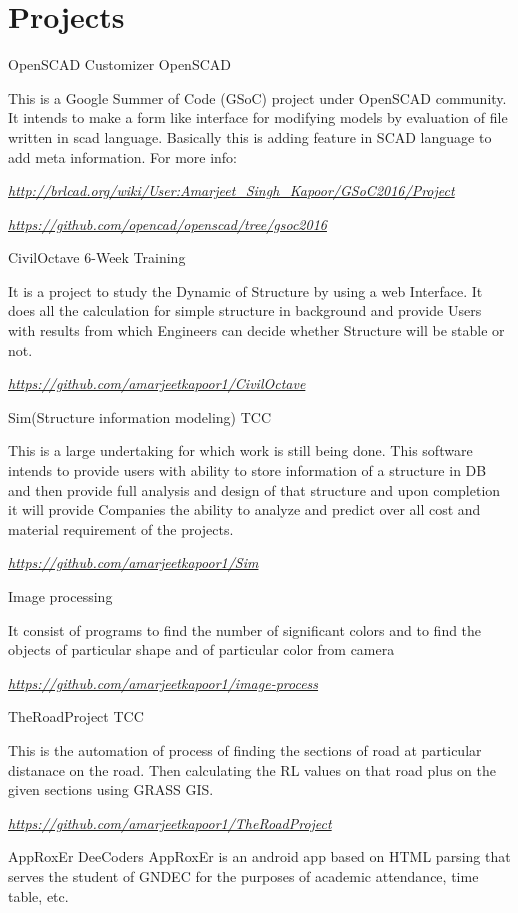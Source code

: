 \documentclass[]{friggeri-cv}
\begin{document}
\section{Projects}
\begin{entrylist}
  \entry
    {}
    {OpenSCAD Customizer}
    {OpenSCAD}
    {
        This is a Google Summer of Code (GSoC) project under OpenSCAD community. It
        intends to make a form like interface for modifying models by
        evaluation of file written in scad language. Basically this is
        adding feature in SCAD language to add meta information. For
        more info:
    
    
        \textit{\href{http://brlcad.org/wiki/User:Amarjeet_Singh_Kapoor/GSoC2016/Project}{http://brlcad.org/wiki/User:Amarjeet\_Singh\_Kapoor/GSoC2016/Project}}
        
        \textit{\href{https://github.com/openscad/openscad/tree/gsoc2016}{https://github.com/opencad/openscad/tree/gsoc2016}}
    }
  \entry
    {}
    {CivilOctave}
    {6-Week Training}
    {
        It is a project to study the Dynamic of Structure by using a web
        Interface. It does all the calculation for simple structure in
        background and provide Users with results from which
        Engineers can decide whether Structure will be stable or not.
        
        
        \textit{\href{https://github.com/amarjeetkapoor1/CivilOctave}{https://github.com/amarjeetkapoor1/CivilOctave}}
    }
    \entry
    {}
    {Sim(Structure information modeling)}
    {TCC}
    {
        This is a large undertaking for which work is still being done.
        This software intends to provide users with ability to store
        information of a structure in DB and then provide full analysis
        and design of that structure and upon completion it will provide
        Companies the ability to analyze and predict over all cost and
        material requirement of the projects.
        
        \textit{\href{https://github.com/amarjeetkapoor1/Sim}{https://github.com/amarjeetkapoor1/Sim}}
    }
    \entry
    {}
    {Image processing}
    {}
    {
        It consist of programs to find the number of significant colors and to find the objects of particular shape and of particular
    color from camera
    
    
        \textit{\href{https://github.com/amarjeetkapoor1/image-process}{https://github.com/amarjeetkapoor1/image-process}}
    }
    
    \entry
    {}
    {TheRoadProject}
    {TCC}
    {
    This is the automation of process of finding the sections of road at particular distanace on the road. Then calculating the RL values on that road plus on the given sections using GRASS GIS.
    
    
    \textit{\href{https://github.com/amarjeetkapoor1/TheRoadProject}{ https://github.com/amarjeetkapoor1/TheRoadProject}
    }}
    
        \entry
    {}
    {AppRoxEr}
    {DeeCoders}
    {
     AppRoxEr is an android app based on HTML parsing that serves the student of GNDEC for the purposes of academic attendance, time table, etc.
    }
    
\end{entrylist}
\end{document}
